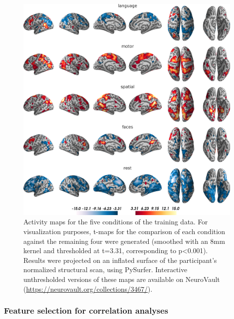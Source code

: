 \documentclass[fleqn,10pt]{SelfArx} %
\begin{document}
\begin{figure}[htbp]
	\begin{minipage}{\textwidth}
		\renewcommand{\familydefault}{\sfdefault}\normalfont
		\centering
		\includegraphics[width=\columnwidth]{./figs/fig2_tMapTrainBrains.png}
				\vspace*{-3mm}
		\caption{Activity maps for the five conditions of the training data. For visualization purposes, t-maps for the comparison of each condition against the remaining four were generated (smoothed with an 8mm kernel and thresholded at t=3.31, corresponding to p<0.001). Results were projected on an inflated surface of the participant's normalized structural scan, using PySurfer. Interactive unthresholded versions of these maps are available on NeuroVault (\href{https://neurovault.org/collections/3467/}{https://neurovault.org/collections/3467/}).}%
		\label{fig:trainBrains}
	\end{minipage}
\end{figure}

\subsubsection*{Feature selection for correlation analyses}
\end{document}
